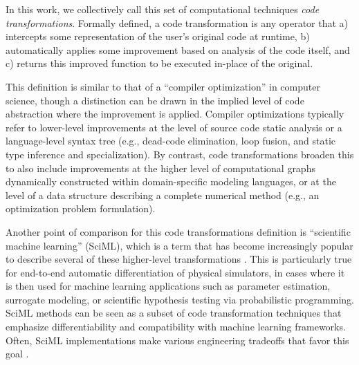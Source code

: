 In this work, we collectively call this set of computational techniques \emph{code transformations}. Formally defined, a code transformation is any operator that a) intercepts some representation of the user's original code at runtime, b) automatically applies some improvement based on analysis of the code itself, and c) returns this improved function to be executed in-place of the original.

This definition is similar to that of a ``compiler optimization'' in computer science, though a distinction can be drawn in the implied level of code abstraction where the improvement is applied. Compiler optimizations typically refer to lower-level improvements at the level of source code static analysis or a language-level syntax tree (e.g., dead-code elimination, loop fusion, and static type inference and specialization). By contrast, code transformations broaden this to also include improvements at the higher level of computational graphs dynamically constructed within domain-specific modeling languages, or at the level of a data structure describing a complete numerical method (e.g., an optimization problem formulation).

Another point of comparison for this code transformations definition is ``scientific machine learning'' (SciML), which is a term that has become increasingly popular to describe several of these higher-level transformations \cite{ma_modelingtoolkit_2021, hu_taichi_2018, lavin_simulation_2022}. This is particularly true for end-to-end automatic differentiation of physical simulators, in cases where it is then used for machine learning applications such as parameter estimation, surrogate modeling, or scientific hypothesis testing via probabilistic programming. SciML methods can be seen as a subset of code transformation techniques that emphasize differentiability and compatibility with machine learning frameworks. Often, SciML implementations make various engineering tradeoffs that favor this goal \cite{rackauckas_engineering_2021}.


